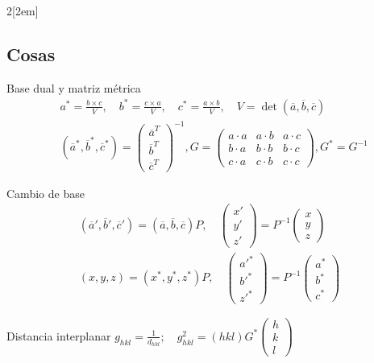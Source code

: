 \documentclass[leqno]{article}
\begin{document}
\begin{multicols}{2}[\columnsep2em]
\subsection{Cosas}
Base dual y matriz métrica
\begin{align*}
  & a^* = \frac{b\times c}{V}, \quad b^* = \frac{c\times a}{V}  , \quad c^* = \frac{a\times b}{V}, \quad V = \det(\overline{a}, \overline{b}, \overline{c})  \\
  & (\overline{a}^*, \overline{b}^*, \overline{c}^*)=\begin{pmatrix} \overline{a}^T\\\overline{b}^T\\\overline{c}^T \end{pmatrix} ^{-1}, G = \begin{pmatrix} a\cdot a & a\cdot b & a\cdot c \\ b\cdot a & b\cdot b & b\cdot c \\ c\cdot a & c\cdot b & c\cdot c \end{pmatrix}, G^* = G^{-1}
\end{align*}

Cambio de base
\begin{align*}
  (\overline{a}', \overline{b}', \overline{c}') = (\overline{a}, \overline{b}, \overline{c})P, \quad \begin{pmatrix} x' \\ y' \\z' \end{pmatrix} =P^{-1} \begin{pmatrix} x\\y\\z \end{pmatrix} \\
  (x, y, z) = (x^*, y^*, z^*)P, \quad \begin{pmatrix} a'^* \\ b'^* \\z'^* \end{pmatrix} =P^{-1} \begin{pmatrix} a^*\\b^*\\c^* \end{pmatrix} 
\end{align*}

Distancia interplanar $g_{hkl}= \frac{1}{d_{hkl}}; \quad g_{hkl}^2 = (hkl)G^*\begin{pmatrix} h\\k\\l \end{pmatrix}  $


\end{multicols}
\end{document}

